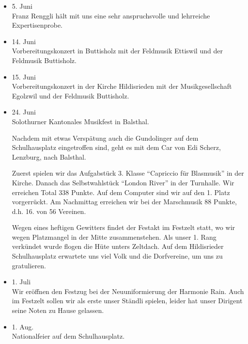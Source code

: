 \begin{history}
\begin{itemize}
        \item 5. Juni\\
              Franz Renggli hält mit uns eine sehr anspruchsvolle und lehrreiche
              Expertisenprobe.

        \item 14. Juni\\
              Vorbereitungskonzert in Buttisholz mit der Feldmusik Ettiswil und der
              Feldmusik Buttisholz.

        \item 15. Juni\\
              Vorbereitungskonzert in der Kirche Hildisrieden mit der
              Musikgesellschaft Egolzwil und der Feldmusik Buttisholz.

        \item 24. Juni\\
              Solothurner Kantonales Musikfest in Balsthal.

              Nachdem mit etwas Verspätung auch die Gundolinger auf dem Schulhausplatz
              eingetroffen sind, geht es mit dem Car von Edi Scherz, Lenzburg, nach
              Balsthal.

              Zuerst spielen wir das Aufgabstück 3. Klasse \enquote{Capriccio für
                  Blasmusik} in der Kirche. Danach das Selbstwahlstück \enquote{London
                  River} in der Turnhalle. Wir erreichen Total 338 Punkte. Auf dem
              Computer sind wir auf den 1. Platz vorgerrückt. Am Nachmittag
              erreichen wir bei der Marschmusik 88 Punkte, d.h. 16. von 56
              Vereinen.

              Wegen eines heftigen Gewitters findet der Festakt im Festzelt statt, wo
              wir wegen Platzmangel in der Mitte zusammenstehen. Als unser 1. Rang
              verkündet wurde flogen die Hüte unters Zeltdach. Auf dem Hildisrieder
              Schulhausplatz erwartete uns viel Volk und die Dorfvereine, um uns zu
              gratulieren.

        \item 1. Juli\\
              Wir eröffnen den Festzug bei der Neuuniformierung der Harmonie Rain.
              Auch im Festzelt sollen wir als erste unser Ständli spielen, leider hat
              unser Dirigent seine Noten zu Hause gelassen.

        \item 1. Aug.\\
              Nationalfeier auf dem Schulhausplatz.


\end{itemize}
\end{history}
